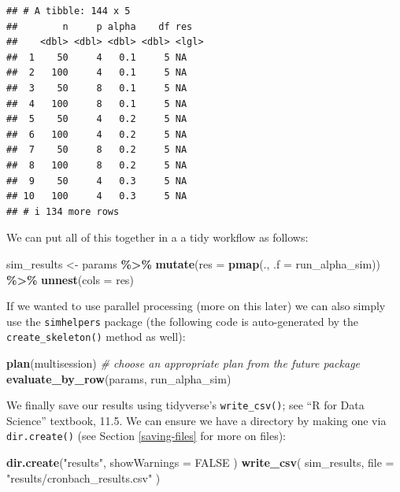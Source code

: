 \documentclass[
]{book}
\newenvironment{Shaded}{\begin{snugshade}}{\end{snugshade}}
\newcommand{\AttributeTok}[1]{\textcolor[rgb]{0.13,0.29,0.53}{#1}}
\newcommand{\CommentTok}[1]{\textcolor[rgb]{0.56,0.35,0.01}{\textit{#1}}}
\newcommand{\ConstantTok}[1]{\textcolor[rgb]{0.56,0.35,0.01}{#1}}
\newcommand{\FunctionTok}[1]{\textcolor[rgb]{0.13,0.29,0.53}{\textbf{#1}}}
\newcommand{\NormalTok}[1]{#1}
\newcommand{\OtherTok}[1]{\textcolor[rgb]{0.56,0.35,0.01}{#1}}
\newcommand{\SpecialCharTok}[1]{\textcolor[rgb]{0.81,0.36,0.00}{\textbf{#1}}}
\newcommand{\StringTok}[1]{\textcolor[rgb]{0.31,0.60,0.02}{#1}}
\begin{document}
\begin{verbatim}
## # A tibble: 144 x 5
##        n     p alpha    df res  
##    <dbl> <dbl> <dbl> <dbl> <lgl>
##  1    50     4   0.1     5 NA   
##  2   100     4   0.1     5 NA   
##  3    50     8   0.1     5 NA   
##  4   100     8   0.1     5 NA   
##  5    50     4   0.2     5 NA   
##  6   100     4   0.2     5 NA   
##  7    50     8   0.2     5 NA   
##  8   100     8   0.2     5 NA   
##  9    50     4   0.3     5 NA   
## 10   100     4   0.3     5 NA   
## # i 134 more rows
\end{verbatim}

We can put all of this together in a a tidy workflow as follows:

\begin{Shaded}
\begin{Highlighting}[]
\NormalTok{sim\_results }\OtherTok{\textless{}{-}} 
\NormalTok{  params }\SpecialCharTok{\%\textgreater{}\%}
  \FunctionTok{mutate}\NormalTok{(}\AttributeTok{res =} \FunctionTok{pmap}\NormalTok{(., }\AttributeTok{.f =}\NormalTok{ run\_alpha\_sim)) }\SpecialCharTok{\%\textgreater{}\%}
  \FunctionTok{unnest}\NormalTok{(}\AttributeTok{cols =}\NormalTok{ res)}
\end{Highlighting}
\end{Shaded}

If we wanted to use parallel processing (more on this later) we can also simply use the \texttt{simhelpers} package (the following code is auto-generated by the \texttt{create\_skeleton()} method as well):

\begin{Shaded}
\begin{Highlighting}[]
\FunctionTok{plan}\NormalTok{(multisession) }\CommentTok{\# choose an appropriate plan from the future package}
\FunctionTok{evaluate\_by\_row}\NormalTok{(params, run\_alpha\_sim)}
\end{Highlighting}
\end{Shaded}

We finally save our results using tidyverse's \texttt{write\_csv()}; see ``R for Data Science'' textbook, 11.5.
We can ensure we have a directory by making one via \texttt{dir.create()} (see Section \ref{saving-files} for more on files):

\begin{Shaded}
\begin{Highlighting}[]
\FunctionTok{dir.create}\NormalTok{(}\StringTok{"results"}\NormalTok{, }\AttributeTok{showWarnings =} \ConstantTok{FALSE}\NormalTok{ )}
\FunctionTok{write\_csv}\NormalTok{( sim\_results, }\AttributeTok{file =} \StringTok{"results/cronbach\_results.csv"}\NormalTok{ )}
\end{Highlighting}
\end{Shaded}
\end{document}
